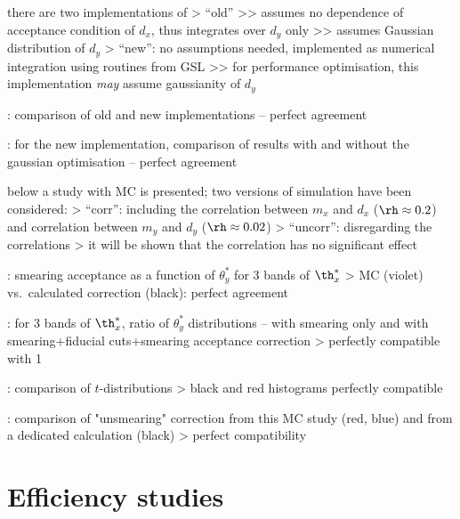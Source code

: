 \> there are two implementations of 
\>> ``old''
\>>> assumes no dependence of acceptance condition of $d_x$, thus integrates over $d_y$ only
\>>> assumes Gaussian distribution of $d_y$
\>> ``new'': no assumptions needed, implemented as numerical integration using routines from GSL
\>>> for performance optimisation, this implementation {\it may} assume gaussianity of $d_y$

\>  : comparison of old and new implementations -- perfect agreement

\>  : for the new implementation, comparison of results with and without the gaussian optimisation -- perfect agreement

\> below a study with MC is presented; two versions of simulation have been considered:
\>> ``corr'': including the correlation between $m_x$ and $d_x$ ($\rh \approx 0.2$) and correlation between $m_y$ and $d_y$ ($\rh\approx 0.02$)
\>> ``uncorr'': disregarding the correlations
\>> it will be shown that the correlation has no significant effect

\>  : smearing acceptance as a function of $\theta^*_y$ for 3 bands of $\th^*_x$
\>> MC (violet) vs.~calculated correction (black): perfect agreement

\>  : for 3 bands of $\th^*_x$, ratio of $\theta^*_y$ distributions -- with smearing only and with smearing+fiducial cuts+smearing acceptance correction
\>> perfectly compatible with 1

\>  : comparison of $t$-distributions
\>> black and red histograms perfectly compatible

\>  : comparison of "unsmearing" correction from this MC study (red, blue) and from a dedicated calculation (black)
\>> perfect compatibility



\chapter[efficiency]{Efficiency studies}

